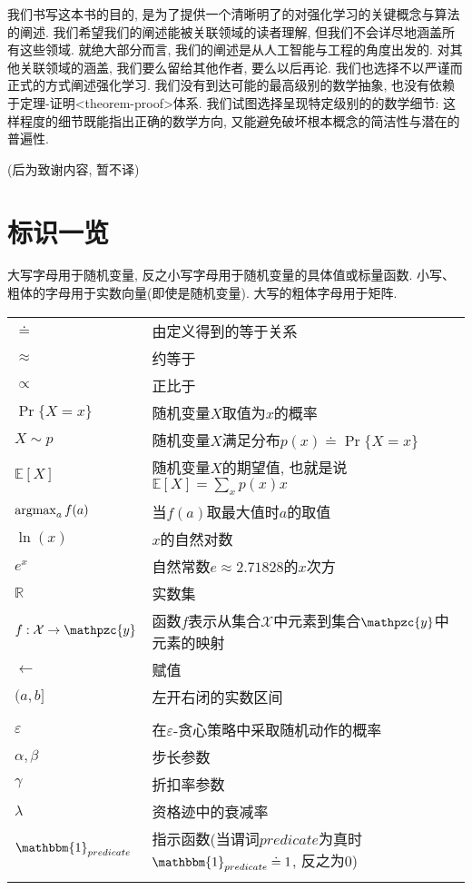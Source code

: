 我们书写这本书的目的, 是为了提供一个清晰明了的对强化学习的关键概念与算法的阐述. 我们希望我们的阐述能被关联领域的读者理解, 但我们不会详尽地涵盖所有这些领域. 就绝大部分而言, 我们的阐述是从人工智能与工程的角度出发的. 对其他关联领域的涵盖, 我们要么留给其他作者, 要么以后再论. 我们也选择不以严谨而正式的方式阐述强化学习. 我们没有到达可能的最高级别的数学抽象, 也没有依赖于定理-证明<theorem-proof>体系. 我们试图选择呈现特定级别的的数学细节: 这样程度的细节既能指出正确的数学方向, 又能避免破坏根本概念的简洁性与潜在的普遍性.

(后为致谢内容, 暂不译)
\clearpage

{}
\hypertarget{sec:notation}{}
\section*{标识一览}\label{sec:notation}

大写字母用于随机变量, 反之小写字母用于随机变量的具体值或标量函数. 小写、粗体的字母用于实数向量(即使是随机变量). 大写的粗体字母用于矩阵.
\bigskip

\begin{longtable}[l]{p{6em}l}
$\doteq$  &  由定义得到的等于关系    \\
$\approx$ & 约等于 \\
$\propto$     &   正比于   \\
$\Pr \{X=x\}$     &    随机变量$X$取值为$x$的概率  \\
$X \sim p$   &   随机变量$X$满足分布$p(x) \doteq \Pr\{X = x\}$    \\
$\mathbb{E}[X]$    &   随机变量$X$的期望值, 也就是说$\mathbb{E}[X] = \sum_x p(x)x$   \\
$\operatorname{argmax}_a f(a)$   &   当$f(a)$取最大值时$a$的取值   \\
$\ln (x)$   &    $x$的自然对数   \\
$e^x$   &    自然常数$e \approx 2.71828$的$x$次方  \\
$\mathbb{R}$ & 实数集 \\
$f: \mathcal{X} \rightarrow \mathpzc{y}$ & 函数$f$表示从集合$\mathcal X$中元素到集合$\mathpzc{y}$中元素的映射 \\
$\leftarrow$ & 赋值 \\
$(a, b]$ & 左开右闭的实数区间 \\
 & \\
$\varepsilon$ & 在$\varepsilon$-贪心策略中采取随机动作的概率 \\
$\alpha, \beta$ & 步长参数 \\
$\gamma$ & 折扣率参数 \\
$\lambda$ & 资格迹中的衰减率 \\
$\mathbbm{1}_{predicate}$ & 指示函数(当谓词$predicate$为真时$\mathbbm{1}_{predicate} \doteq 1$, 反之为0) \\
 & \\
\end{longtable}


